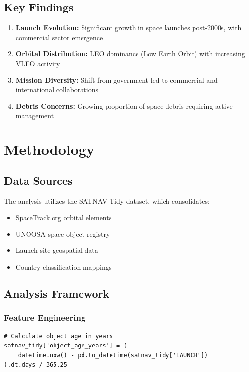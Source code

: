 \documentclass[12pt,a4paper]{article}
\begin{document}
\subsection{Key Findings}

\begin{enumerate}
    \item \textcolor{accentcolor}{\textbf{Launch Evolution:}} Significant growth in space launches post-2000s, with commercial sector emergence
    \item \textcolor{accentcolor}{\textbf{Orbital Distribution:}} LEO dominance (Low Earth Orbit) with increasing VLEO activity
    \item \textcolor{accentcolor}{\textbf{Mission Diversity:}} Shift from government-led to commercial and international collaborations
    \item \textcolor{accentcolor}{\textbf{Debris Concerns:}} Growing proportion of space debris requiring active management
\end{enumerate}

\section{Methodology}

\subsection{Data Sources}
The analysis utilizes the SATNAV Tidy dataset, which consolidates:
\begin{itemize}
    \item SpaceTrack.org orbital elements
    \item UNOOSA space object registry
    \item Launch site geospatial data
    \item Country classification mappings
\end{itemize}

\subsection{Analysis Framework}

\subsubsection{Feature Engineering}
\begin{lstlisting}[caption=Object Age Calculation]
# Calculate object age in years
satnav_tidy['object_age_years'] = (
    datetime.now() - pd.to_datetime(satnav_tidy['LAUNCH'])
).dt.days / 365.25
\end{lstlisting}
\end{document}
